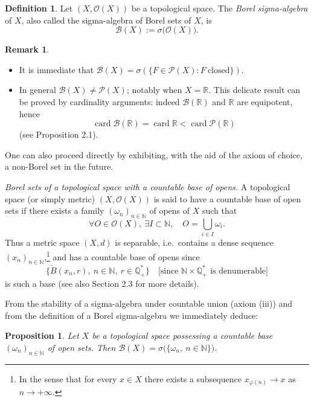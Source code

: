 \documentclass[11pt]{article}
\newtheorem{proposition}{Proposition}[section]
\theoremstyle{definition}
\newtheorem{definition}{Definition}[section]
\newtheorem{remark}{Remark}[section]
\begin{document}
\begin{definition}
Let $(X,\mathcal O(X))$ be a topological space. The \emph{Borel sigma-algebra} of $X$, also called the sigma-algebra of Borel sets of $X$, is
\[
\mathcal B(X):=\sigma\bigl(\mathcal O(X)\bigr).
\]
\end{definition}

\begin{remark}
\begin{itemize}[leftmargin=1.5em]
\item It is immediate that $\mathcal B(X)=\sigma(\{F\in\mathcal P(X): F\ \text{closed}\})$.
\item In general $\mathcal B(X)\ne\mathcal P(X)$; notably when $X=\mathbb R$. This delicate result can be proved by cardinality arguments: indeed $\mathcal B(\mathbb R)$ and $\mathbb R$ are equipotent, hence
\[
\operatorname{card}\mathcal B(\mathbb R)=\operatorname{card}\mathbb R<\operatorname{card}\mathcal P(\mathbb R)
\]
(see Proposition 2.1).
\end{itemize}

\end{remark}
One can also proceed directly by exhibiting, with the aid of the axiom of choice, a non-Borel set in the future.

\medskip\noindent
\textit{Borel sets of a topological space with a countable base of opens.}
A topological space (or simply metric) $(X,\mathcal O(X))$ is said to have a countable base of open sets if there exists a family $(\omega_n)_{n\in\mathbb N}$ of opens of $X$ such that
\[
\forall O\in\mathcal O(X),\ \exists I\subset\mathbb N,\quad O=\bigcup_{i\in I}\omega_i .
\]
Thus a metric space $(X,d)$ is separable, i.e.\ contains a dense sequence $(x_n)_{n\in\mathbb N}$,\footnote{In the sense that for every $x\in X$ there exists a subsequence $x_{\varphi(n)}\to x$ as $n\to +\infty$.}
and has a countable base of opens since
\[
\bigl\{\mathring B(x_n,r),\ n\in\mathbb N,\ r\in\mathbb Q^{\ast}_+\bigr\}\quad\text{[since $\mathbb N\times\mathbb Q^{\ast}_+$ is denumerable]}
\]
is such a base (see also Section 2.3 for more details).

From the stability of a sigma-algebra under countable union (axiom (iii)) and from the definition of a Borel sigma-algebra we immediately deduce:

\begin{proposition}
Let $X$ be a topological space possessing a countable base $(\omega_n)_{n\in\mathbb N}$ of open sets. Then $\mathcal B(X)=\sigma\bigl(\{\omega_n,\ n\in\mathbb N\}\bigr)$.
\end{proposition}
\end{document}
